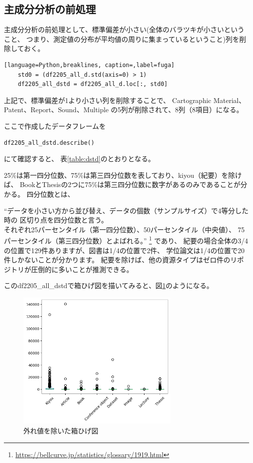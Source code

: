 \documentclass[submit,noauthor]{ono}
\begin{document}
\subsection{主成分分析の前処理}
主成分分析の前処理として、標準偏差が小さい(全体のバラツキが小さいということ、
つまり、測定値の分布が平均値の周りに集まっているということ)列を削除しておく。

\begin{lstlisting}[language=Python,breaklines, caption=,label=fuga]
	std0 = (df2205_all_d.std(axis=0) > 1)
	df2205_all_dstd = df2205_all_d.loc[:, std0]
\end{lstlisting}

上記で、標準偏差が1より小さい列を削除することで、
Cartographic Material、Patent、Report、Sound、Multiple
の5列が削除されて、8列（8項目）になる。

ここで作成したデータフレームを

\begin{lstlisting}[language=Python,breaklines]
	df2205_all_dstd.describe()
\end{lstlisting}

にて確認すると、
表\ref{table:dstd}のとおりとなる。

25\%は第一四分位数、75\%は第三四分位数を表しており、kiyou（紀要）を除けば、
BookとThesisの2つに75\%は第三四分位数に数字があるのみであることが分かる。
四分位数とは、

“データを小さい方から並び替え、データの個数（サンプルサイズ）で4等分した時の
区切り点を四分位数と言う。\\
それぞれ25パーセンタイル（第一四分位数）、50パーセンタイル（中央値）、
75パーセンタイル（第三四分位数）とよばれる。”
\footnote{\url{https://bellcurve.jp/statistics/glossary/1919.html}}
であり、
紀要の場合全体の3/4の位置で129件ありますが、図書は1/4の位置で2件、
学位論文は1/4の位置で20件しかないことが分かります。
紀要を除けば、他の資源タイプはゼロ件のリポジトリが圧倒的に多いことが推測できる。


このdf2205\_all\_dstdで箱ひげ図を描いてみると、図\ref{fig:box1}のようになる。

\begin{figure}[h]
	\includegraphics[width=8cm]{./picture/df2205alldstdboxplot.png}
	\caption{外れ値を除いた箱ひげ図}
	\label{fig:box1}
\end{figure}
\end{document}
